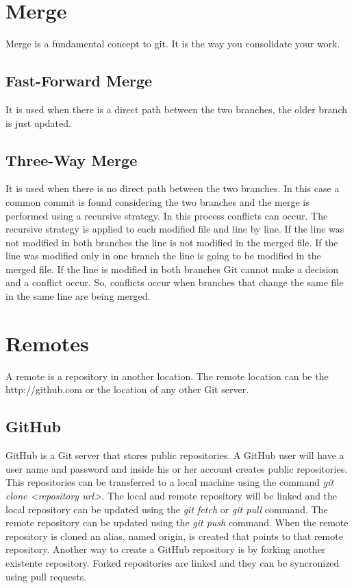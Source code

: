 \begin{refsection}
\section{Merge}

Merge is a fundamental concept to git. It is the way you consolidate your work.

\subsection{Fast-Forward Merge}

It is used when there is a direct path between the two branches, the older branch is just updated.

\subsection{Three-Way Merge}

It is used when there is no direct path between the two branches. In this case a common commit is found considering the two branches and the merge is performed using a recursive strategy.
In this process conflicts can occur.
The recursive strategy is applied to each modified file and line by line.
If the line was not modified in both branches the line is not modified in the merged file.
If the line was modified only in one branch the line is going to be modified in the merged file.
If the line is modified in both branches Git cannot make a decision and a conflict occur.
So, conflicts occur when branches that change the same file in the same line are being merged.

\section{Remotes}

A remote is a repository in another location. The remote location can be the http://github.com or the location of any other Git server.

\subsection{GitHub}

GitHub is a Git server that stores public repositories.
A GitHub user will have a user name and password and inside his or her account creates public repositories.
This repositories can be transferred to a local machine using the command \emph{git clone <repository url>}.
The local and remote repository will be linked and the local repository can be updated using the \emph{git fetch} or \emph{git pull} command.
The remote repository can be updated using the \emph{git push} command.
When the remote repository is cloned an alias, named origin, is created that points to that remote repository.
Another way to create a GitHub repository is by forking another existente repository.
Forked repositories are linked and they can be syncronized using pull requests.


\end{refsection}

